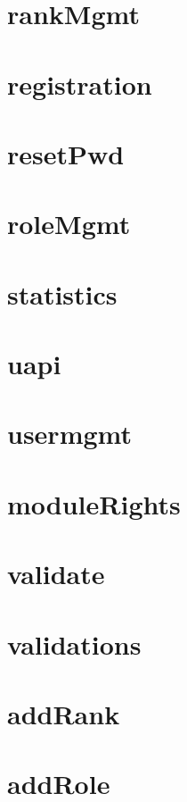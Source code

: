 \section{rankMgmt}

\newpage
\section{registration}

\newpage
\section{resetPwd}

\newpage
\section{roleMgmt}

\newpage
\section{statistics}

\newpage
\section{uapi}

\newpage
\section{usermgmt}

\newpage
\section{moduleRights}

\newpage
\section{validate}

\newpage
\section{validations}

\newpage
\section{addRank}

\newpage
\section{addRole}

\newpage

